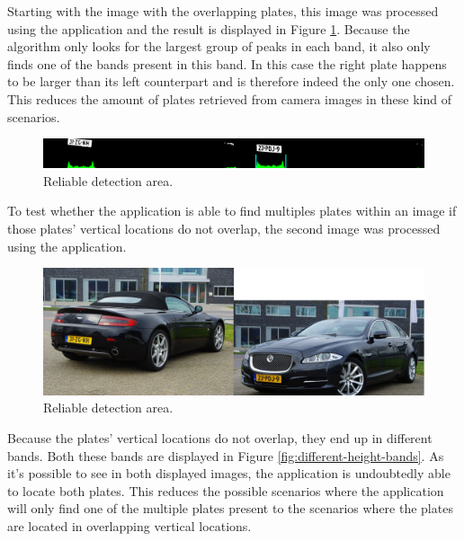 Starting with the image with the overlapping plates, this image was processed using the application and the result is displayed in Figure \ref{fig:same-height-band}. Because the algorithm only looks for the largest group of peaks in each band, it also only finds one of the bands present in this band. In this case the right plate happens to be larger than its left counterpart and is therefore indeed the only one chosen. This reduces the amount of plates retrieved from camera images in these kind of scenarios.


\begin{figure}[ht]
    \centering
    \includegraphics[width=\textwidth]{plaatjes/85-graph}
    \caption{Reliable detection area.}
    \label{fig:same-height-band}
\end{figure}%

To test whether the application is able to find multiples plates within an image if those plates' vertical locations do not overlap, the second image was processed using the application.

\clearpage 

\begin{figure}[ht]
    \centering
    \includegraphics[width=\textwidth]{plaatjes/85-offset}
    \caption{Reliable detection area.}
    \label{fig:different-height-source}
\end{figure}%

Because the plates' vertical locations do not overlap, they end up in different bands. Both these bands are displayed in Figure \ref{fig:different-height-bands}. As it's possible to see in both displayed images, the application is undoubtedly able to locate both plates. This reduces the possible scenarios where the application will only find one of the multiple plates present to the scenarios where the plates are located in overlapping vertical locations.  

